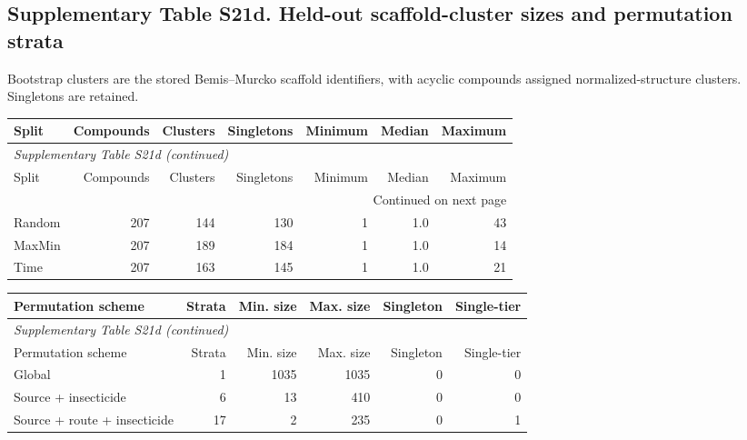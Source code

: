 \subsection*{Supplementary Table S21d. Held-out scaffold-cluster sizes and permutation strata}

Bootstrap clusters are the stored Bemis--Murcko scaffold identifiers, with acyclic compounds assigned normalized-structure clusters. Singletons are retained.

\begingroup\small\setlength{\tabcolsep}{4pt}

\begin{longtable}{lrrrrrr}

\toprule Split & Compounds & Clusters & Singletons & Minimum & Median & Maximum \\ \midrule\endfirsthead

\multicolumn{7}{l}{\textit{Supplementary Table S21d (continued)}} \\

\toprule Split & Compounds & Clusters & Singletons & Minimum & Median & Maximum \\ \midrule\endhead

\midrule\multicolumn{7}{r}{Continued on next page}\\\endfoot\bottomrule\endlastfoot

Random & 207 & 144 & 130 & 1 & 1.0 & 43 \\

MaxMin & 207 & 189 & 184 & 1 & 1.0 & 14 \\

Time & 207 & 163 & 145 & 1 & 1.0 & 21 \\

\end{longtable}\endgroup

\begin{longtable}{lrrrrr}

\toprule Permutation scheme & Strata & Min. size & Max. size & Singleton & Single-tier \\ \midrule\endfirsthead

\multicolumn{6}{l}{\textit{Supplementary Table S21d (continued)}} \\

\toprule Permutation scheme & Strata & Min. size & Max. size & Singleton & Single-tier \\ \midrule\endhead

\bottomrule\endlastfoot

Global & 1 & 1035 & 1035 & 0 & 0 \\

Source + insecticide & 6 & 13 & 410 & 0 & 0 \\

Source + route + insecticide & 17 & 2 & 235 & 0 & 1 \\

\end{longtable}

